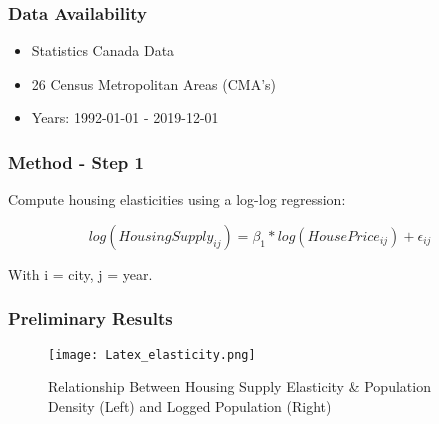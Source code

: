 \documentclass{beamer}
\begin{document}
\begin{frame}
\frametitle{Data Availability}
\begin{itemize}
   \setlength{\itemsep}{1.5\baselineskip} %
    \item Statistics Canada Data
    \item 26 Census Metropolitan Areas (CMA's)
    \item Years: 1992-01-01 - 2019-12-01 
\end{itemize}
\end{frame}

\begin{frame}
\frametitle{Method - Step 1}
Compute housing elasticities using a log-log regression:
\medskip{}

\[
log(HousingSupply_{ij}) = \beta_1 *log(HousePrice_{ij}) + \epsilon_{ij}
\]
\smallskip{}

With i = city, j = year.
\end{frame}

\begin{frame}
\frametitle{Preliminary Results}
\begin{figure}
    \centering
    \texttt{[image: Latex\_elasticity.png]}
    \caption{Relationship Between Housing Supply Elasticity \& Population Density (Left) and Logged Population (Right)}
    \label{fig:enter-label}
\end{figure}
\end{frame}
\end{document}
